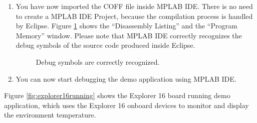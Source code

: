 \begin{enumerate}
\item
  You have now imported the COFF file inside MPLAB IDE. There is no
  need to create a MPLAB IDE Project, because the compilation process
  is handled by Eclipse. Figure \ref{fig:mplab4} shows the
  ``Disassembly Listing'' and the ``Program Memory'' window. Please
  note that MPLAB IDE correctly recognizes the debug symbols of the source
  code produced inside Eclipse.
%
\begin{figure}[htb]
\caption{Debug symbols are correctly recognized.}
\label{fig:mplab4}
\end{figure}

\item
  You can now start debugging the demo application using MPLAB IDE.
\end{enumerate}

Figure \ref{fig:explorer16running} shows the Explorer 16 board  
running  demo application, which uses the
Explorer 16 onboard devices to monitor and display the environment temperature.

